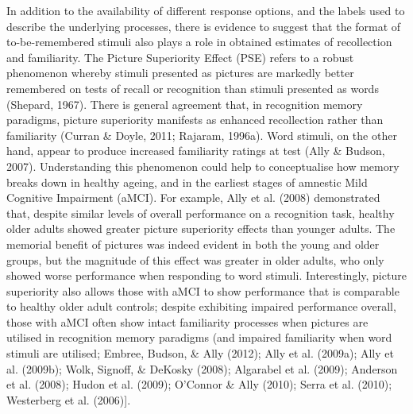 \documentclass[
  11pt,
]{article}
\begin{document}
In addition to the availability of different response options, and the
labels used to describe the underlying processes, there is evidence to
suggest that the format of to-be-remembered stimuli also plays a role in
obtained estimates of recollection and familiarity. The Picture
Superiority Effect (PSE) refers to a robust phenomenon whereby stimuli
presented as pictures are markedly better remembered on tests of recall
or recognition than stimuli presented as words (Shepard, 1967). There is
general agreement that, in recognition memory paradigms, picture
superiority manifests as enhanced recollection rather than familiarity
(Curran \& Doyle, 2011; Rajaram, 1996a). Word stimuli, on the other
hand, appear to produce increased familiarity ratings at test (Ally \&
Budson, 2007). Understanding this phenomenon could help to conceptualise
how memory breaks down in healthy ageing, and in the earliest stages of
amnestic Mild Cognitive Impairment (aMCI). For example, Ally et al.
(2008) demonstrated that, despite similar levels of overall performance
on a recognition task, healthy older adults showed greater picture
superiority effects than younger adults. The memorial benefit of
pictures was indeed evident in both the young and older groups, but the
magnitude of this effect was greater in older adults, who only showed
worse performance when responding to word stimuli. Interestingly,
picture superiority also allows those with aMCI to show performance that
is comparable to healthy older adult controls; despite exhibiting
impaired performance overall, those with aMCI often show intact
familiarity processes when pictures are utilised in recognition memory
paradigms (and impaired familiarity when word stimuli are utilised;
Embree, Budson, \& Ally (2012); Ally et al. (2009a); Ally et al.
(2009b); Wolk, Signoff, \& DeKosky (2008); Algarabel et al. (2009);
Anderson et al. (2008); Hudon et al. (2009); O'Connor \& Ally (2010);
Serra et al. (2010); Westerberg et al. (2006){]}.

~
\end{document}
